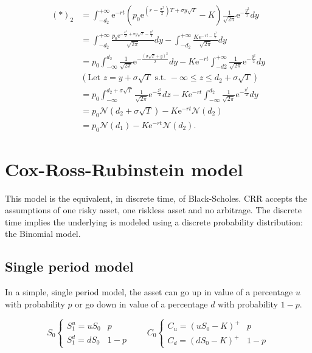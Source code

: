 \documentclass[oneside,titlepage,headinclude,12pt,a4paper,BCOR5mm,footinclude]{book}
\theoremstyle{defn}
\newcommand{\eexp}{\mathrm{e}}
\begin{document}
\begin{align*}
  (*)_2 & = \int_{-d_2}^{+\infty} \eexp^{-rt} \left( p_0 \eexp^{\left(r-\frac{\sigma^2}{2}\right)T + \sigma y\sqrt{T}}-K\right)
    \frac{1}{\sqrt{2\pi}} \eexp^{-\frac{y^2}{2}} dy
    \\ & = \int_{-d_2}^{+\infty} \frac{p_0 \eexp^{-\frac{\sigma^2}{2} + \sigma y\sqrt{T} -\frac{y^2}{2}}}{\sqrt{2\pi}} dy
    - \int_{-d_2}^{+\infty} \frac{K\eexp^{-rt -\frac{y^2}{2}}}{\sqrt{2\pi}}dy
    \\ & = p_0 \int_{-\infty}^{d_2} \frac{1}{\sqrt{2\pi}} \eexp^{-\frac{(\sigma\sqrt{T}+y)^2}{2}}dy
    - K\eexp^{-rt}\int_{-d2}^{+\infty} \frac{1}{\sqrt{2\pi}} \eexp^{-\frac{y^2}{2}} dy
    \\ & \left(\text{Let } z=y+\sigma\sqrt{T} \text{ s.t. } -\infty\leq z \leq d_2+\sigma\sqrt{T}\right)
    \\ & = p_0 \int_{-\infty}^{d_2+\sigma\sqrt{T}} \frac{1}{\sqrt{2\pi}} \eexp^{-\frac{z^2}{2}} dz
    - K\eexp^{-rt}\int_{-\infty}^{d_2} \frac{1}{\sqrt{2\pi}} \eexp^{-\frac{y^2}{2}} dy
    \\ & = p_0 \mathcal{N}(d_2 + \sigma\sqrt{T}) - K\eexp^{-rt} \mathcal{N}(d_2)
    \\ & = p_0 \mathcal{N}(d_1) - K\eexp^{-rt}\mathcal{N}(d_2).
\end{align*}

\section{Cox-Ross-Rubinstein model} 

This model is the equivalent, in  discrete time, of Black-Scholes. CRR accepts
the assumptions of  one risky asset, one riskless asset  and no arbitrage. The
discrete time implies  the underlying is modeled using  a discrete probability
distribution: the Binomial model.

\subsection{Single period model}

In a simple, single period model, the asset can go up in value of a percentage
$u$  with probability  $p$  or go  down  in  value of  a  percentage $d$  with
probability $1-p$.

\[
  S_0 \left\{ \begin{array}{lc}
      S_1^u = uS_0 & p \\ S_1^d= dS_0 & 1-p
    \end{array}
  \quad\quad
  C_0 \left\{ \begin{array}{lc}
      C_u = (uS_0 -K)^+ & p \\ C_d = (dS_0 - K)^+ & 1-p
    \end{array}
\]
\end{document}
